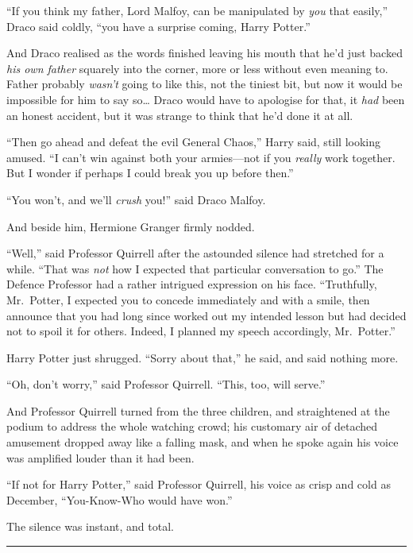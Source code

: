 ``If you think my father, Lord Malfoy, can be manipulated by \emph{you}
that easily,'' Draco said coldly, ``you have a surprise coming, Harry
Potter.''

And Draco realised as the words finished leaving his mouth that he'd
just backed \emph{his own father} squarely into the corner, more or less
without even meaning to. Father probably \emph{wasn't} going to like
this, not the tiniest bit, but now it would be impossible for him to say
so\ldots{} Draco would have to apologise for that, it \emph{had} been an
honest accident, but it was strange to think that he'd done it at all.

``Then go ahead and defeat the evil General Chaos,'' Harry said, still
looking amused. ``I can't win against both your armies---not if you
\emph{really} work together. But I wonder if perhaps I could break you
up before then.''

``You won't, and we'll \emph{crush} you!'' said Draco Malfoy.

And beside him, Hermione Granger firmly nodded.

``Well,'' said Professor Quirrell after the astounded silence had
stretched for a while. ``That was \emph{not} how I expected that
particular conversation to go.'' The Defence Professor had a rather
intrigued expression on his face. ``Truthfully, Mr.~Potter, I expected
you to concede immediately and with a smile, then announce that you had
long since worked out my intended lesson but had decided not to spoil it
for others. Indeed, I planned my speech accordingly, Mr.~Potter.''

Harry Potter just shrugged. ``Sorry about that,'' he said, and said
nothing more.

``Oh, don't worry,'' said Professor Quirrell. ``This, too, will serve.''

And Professor Quirrell turned from the three children, and straightened
at the podium to address the whole watching crowd; his customary air of
detached amusement dropped away like a falling mask, and when he spoke
again his voice was amplified louder than it had been.

``If not for Harry Potter,'' said Professor Quirrell, his voice as crisp
and cold as December, ``You-Know-Who would have won.''

The silence was instant, and total.

\begin{center}\rule{3in}{0.4pt}\end{center}

